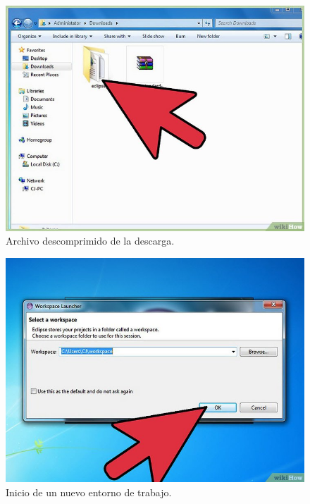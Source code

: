 \begin{figure}[H]
	\begin{center}
		\includegraphics[scale=.4]{images/instalaciones/eclipse/img_eclipse_3}
		\caption{Archivo descomprimido de la descarga.}
	\end{center}
\end{figure} 

\begin{figure}[H]
	\begin{center}
		\includegraphics[scale=.4]{images/instalaciones/eclipse/img_eclipse_4}
		\caption{Inicio de un nuevo entorno de trabajo.}
	\end{center}
\end{figure} 
